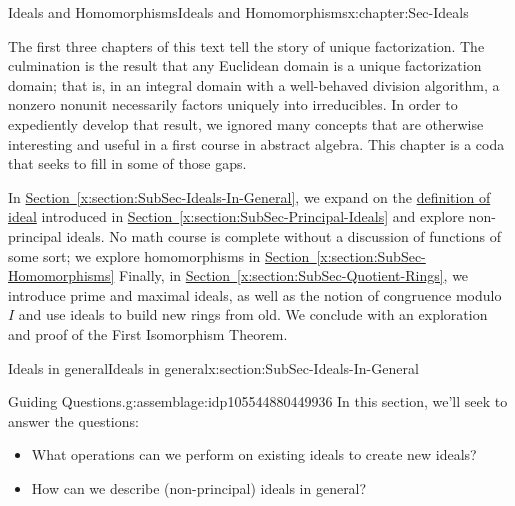 \documentclass[oneside,10pt,]{book}
\newcommand{\xreffont}{\relax}
\numberwithin{equation}{section}
\begin{document}
\begin{chapterptx}{Ideals and Homomorphisms}{}{Ideals and Homomorphisms}{}{}{x:chapter:Sec-Ideals}
\begin{introduction}{}%
The first three chapters of this text tell the story of unique factorization. The culmination is the result that any Euclidean domain is a unique factorization domain; that is, in an integral domain with a well-behaved division algorithm, a nonzero nonunit necessarily factors uniquely into irreducibles. In order to expediently develop that result, we ignored many concepts that are otherwise interesting and useful in a first course in abstract algebra. This chapter is a coda that seeks to fill in some of those gaps.%
\par
In \hyperref[x:section:SubSec-Ideals-In-General]{Section~{\xreffont\ref{x:section:SubSec-Ideals-In-General}}}, we expand on the \hyperref[x:definition:def-ideal]{definition of ideal} introduced in \hyperref[x:section:SubSec-Principal-Ideals]{Section~{\xreffont\ref{x:section:SubSec-Principal-Ideals}}} and explore non-principal ideals. No math course is complete without a discussion of functions of some sort; we explore homomorphisms in \hyperref[x:section:SubSec-Homomorphisms]{Section~{\xreffont\ref{x:section:SubSec-Homomorphisms}}} Finally, in \hyperref[x:section:SubSec-Quotient-Rings]{Section~{\xreffont\ref{x:section:SubSec-Quotient-Rings}}}, we introduce prime and maximal ideals, as well as the notion of congruence modulo \(I\) and use ideals to build new rings from old. We conclude with an exploration and proof of the First Isomorphism Theorem.%
\end{introduction}%
%
%
\typeout{************************************************}
\typeout{************************************************}
%
\begin{sectionptx}{Ideals in general}{}{Ideals in general}{}{}{x:section:SubSec-Ideals-In-General}
\begin{assemblage}{Guiding Questions.}{g:assemblage:idp105544880449936}%
In this section, we'll seek to answer the questions: %
\begin{itemize}[label=\textbullet]
\item{}What operations can we perform on existing ideals to create new ideals?%
\item{}How can we describe (non-principal) ideals in general?%
\end{itemize}
%
\end{assemblage}
\begin{introduction}{}%

\end{introduction}
\end{sectionptx}
\end{chapterptx}
\end{document}

